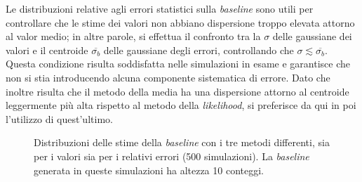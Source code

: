 \documentclass[10pt, oneside, a4paper]{article}   	%
\begin{document}
Le distribuzioni relative agli errori statistici sulla \textit{baseline} sono utili per controllare che le stime dei valori non abbiano dispersione troppo elevata attorno al valor medio; in altre parole, si effettua il confronto tra la $\sigma$ delle gaussiane dei valori e il centroide $\overline{\sigma_{b}}$ delle gaussiane degli errori, controllando che $\sigma\lesssim \overline{\sigma_{b}}$. Questa condizione risulta soddisfatta nelle simulazioni in esame e garantisce che non si stia introducendo alcuna componente sistematica di errore. Dato che inoltre risulta che il metodo della media ha una dispersione attorno al centroide leggermente più alta rispetto al metodo della \textit{likelihood}, si preferisce da qui in poi l'utilizzo di quest'ultimo.
%
\begin{figure}[H]
 \centerline{}
 \caption{Distribuzioni delle stime della \textit{baseline} con i tre metodi differenti, sia per i valori sia per i relativi errori (500 simulazioni). La \textit{baseline} generata in queste simulazioni ha altezza 10 conteggi.}\label{fig::baseline_500}
\end{figure}
%
\end{document}
